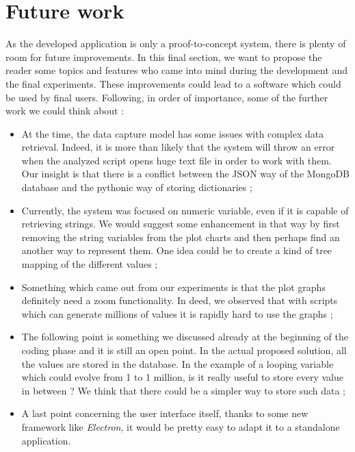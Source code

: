\section{Future work}
As the developed application is only a proof-to-concept system, there is plenty of room for future improvements. In this final section, we want to propose the reader some topics and features who came into mind during the development and the final experiments. These improvements could lead to a software which could be used by final users. Following, in order of importance, some of the further work we could think about :
\begin{itemize}
  \item At the time, the data capture model has some issues with complex data retrieval. Indeed, it is more than likely that the system will throw an error when the analyzed script opens huge text file in order to work with them. Our insight is that there is a conflict between the JSON way of the MongoDB database and the pythonic way of storing dictionaries ;
  \item Currently, the system was focused on numeric variable, even if it is capable of retrieving strings. We would suggest some enhancement in that way by first removing the string variables from the plot charts and then perhaps find an another way to represent them. One idea could be to create a kind of tree mapping of the different values ;
  \item Something which came out from our experiments is that the plot graphs definitely need a zoom functionality. In deed, we observed that with scripts which can generate millions of values it is rapidly hard to use the graphs ; 
  \item The following point is something we discussed already at the beginning of the coding phase and it is still an open point. In the actual proposed solution, all the values are stored in the database. In the example of a looping variable which could evolve from 1 to 1 million, is it really useful to store every value in between ? We think that there could be a simpler way to store such data ;
  \item A last point concerning the user interface itself, thanks to some new framework like \textit{Electron}, it would be pretty easy to adapt it to a standalone application.
\end{itemize}
  
